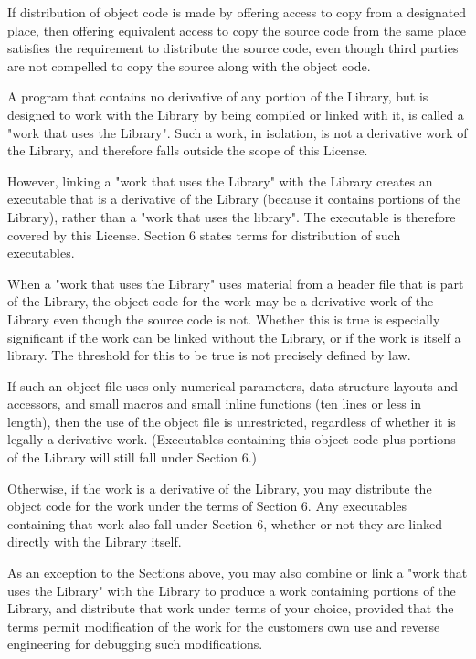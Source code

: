 If distribution of object code is made by offering access to copy from a designated place, then offering equivalent access to copy the source code from the same place satisfies the requirement to distribute the source code, even though third parties are not compelled to copy the source along with the object code.


\begin{DoxyEnumerate}
\item A program that contains no derivative of any portion of the Library, but is designed to work with the Library by being compiled or linked with it, is called a "{}work that uses the Library"{}. Such a work, in isolation, is not a derivative work of the Library, and therefore falls outside the scope of this License.
\end{DoxyEnumerate}

However, linking a "{}work that uses the Library"{} with the Library creates an executable that is a derivative of the Library (because it contains portions of the Library), rather than a "{}work that uses the library"{}. The executable is therefore covered by this License. Section 6 states terms for distribution of such executables.

When a "{}work that uses the Library"{} uses material from a header file that is part of the Library, the object code for the work may be a derivative work of the Library even though the source code is not. Whether this is true is especially significant if the work can be linked without the Library, or if the work is itself a library. The threshold for this to be true is not precisely defined by law.

If such an object file uses only numerical parameters, data structure layouts and accessors, and small macros and small inline functions (ten lines or less in length), then the use of the object file is unrestricted, regardless of whether it is legally a derivative work. (Executables containing this object code plus portions of the Library will still fall under Section 6.)

Otherwise, if the work is a derivative of the Library, you may distribute the object code for the work under the terms of Section 6. Any executables containing that work also fall under Section 6, whether or not they are linked directly with the Library itself.


\begin{DoxyEnumerate}
\item As an exception to the Sections above, you may also combine or link a "{}work that uses the Library"{} with the Library to produce a work containing portions of the Library, and distribute that work under terms of your choice, provided that the terms permit modification of the work for the customer\textquotesingle{}s own use and reverse engineering for debugging such modifications.
\end{DoxyEnumerate}

